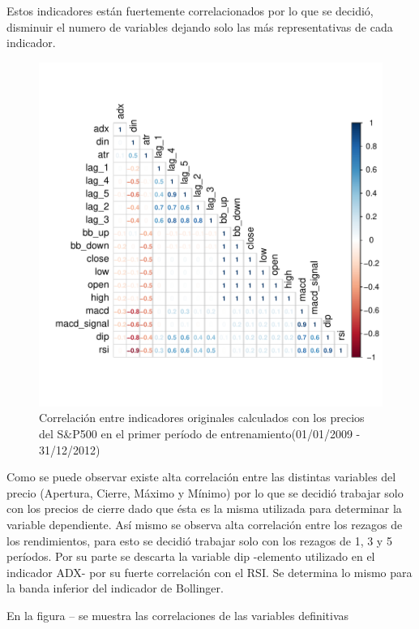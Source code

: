 \documentclass[a4paper,12pt]{Latex/Classes/PhDthesisPSnPDF}
\begin{document}
Estos indicadores están fuertemente correlacionados por lo que se decidió, disminuir el numero de variables dejando solo las más representativas de cada indicador.

\begin{figure}[H]
\centering
\includegraphics{main-003}
\caption{Correlación entre indicadores originales calculados con los precios del S\&P500 en el primer período de entrenamiento(01/01/2009 - 31/12/2012)}
\end{figure}

Como se puede observar existe alta correlación entre las distintas variables del precio (Apertura, Cierre, Máximo y Mínimo) por lo que se decidió trabajar solo con los precios de cierre dado que ésta es la misma utilizada para determinar la variable dependiente. Así mismo se observa alta correlación entre los rezagos de los rendimientos, para esto se decidió trabajar solo con los rezagos de 1, 3 y 5 períodos. Por su parte se descarta la variable dip -elemento utilizado en el indicador ADX- por su fuerte correlación con el RSI. Se determina lo mismo para la banda inferior del indicador de Bollinger.

En la figura -- se muestra las correlaciones de las variables definitivas
\end{document}
